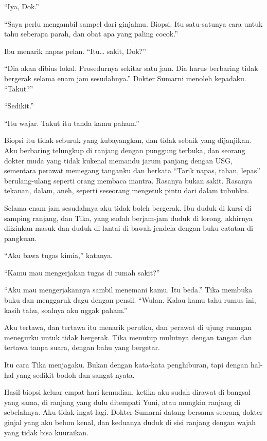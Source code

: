 \documentclass[11pt,twoside,openany]{book}
\makeatletter
\newcommand{\scenebreak}{\par\vspace{0.9em}{\centering\textsc{*\hspace{0.7em}*\hspace{0.7em}*}\par}\vspace{0.9em}\@afterindentfalse\@afterheading}
\makeatother
\begin{document}
``Iya, Dok.''

``Saya perlu mengambil sampel dari ginjalmu. Biopsi. Itu satu-satunya cara untuk tahu seberapa parah, dan obat apa yang paling cocok.''

Ibu menarik napas pelan. ``Itu\ldots{} sakit, Dok?''

``Dia akan dibius lokal. Prosedurnya sekitar satu jam. Dia harus berbaring tidak bergerak selama enam jam sesudahnya.'' Dokter Sumarni menoleh kepadaku. ``Takut?''

``Sedikit.''

``Itu wajar. Takut itu tanda kamu paham.''

\scenebreak
Biopsi itu tidak seburuk yang kubayangkan, dan tidak sebaik yang dijanjikan. Aku berbaring telungkup di ranjang dengan punggung terbuka, dan seorang dokter muda yang tidak kukenal memandu jarum panjang dengan USG, sementara perawat memegang tanganku dan berkata ``Tarik napas, tahan, lepas'' berulang-ulang seperti orang membaca mantra. Rasanya bukan sakit. Rasanya tekanan, dalam, aneh, seperti seseorang mengetuk pintu dari dalam tubuhku.

Selama enam jam sesudahnya aku tidak boleh bergerak. Ibu duduk di kursi di samping ranjang, dan Tika, yang sudah berjam-jam duduk di lorong, akhirnya diizinkan masuk dan duduk di lantai di bawah jendela dengan buku catatan di pangkuan.

``Aku bawa tugas kimia,'' katanya.

``Kamu mau mengerjakan tugas di rumah sakit?''

``Aku mau mengerjakannya sambil menemani kamu. Itu beda.'' Tika membuka buku dan menggaruk dagu dengan pensil. ``Wulan. Kalau kamu tahu rumus ini, kasih tahu, soalnya aku nggak paham.''

Aku tertawa, dan tertawa itu menarik perutku, dan perawat di ujung ruangan menegurku untuk tidak bergerak. Tika menutup mulutnya dengan tangan dan tertawa tanpa suara, dengan bahu yang bergetar.

Itu cara Tika menjagaku. Bukan dengan kata-kata penghiburan, tapi dengan hal-hal yang sedikit bodoh dan sangat nyata.

\scenebreak
Hasil biopsi keluar empat hari kemudian, ketika aku sudah dirawat di bangsal yang sama, di ranjang yang dulu ditempati Yuni, atau mungkin ranjang di sebelahnya. Aku tidak ingat lagi. Dokter Sumarni datang bersama seorang dokter ginjal yang aku belum kenal, dan keduanya duduk di sisi ranjang dengan wajah yang tidak bisa kuuraikan.
\end{document}
